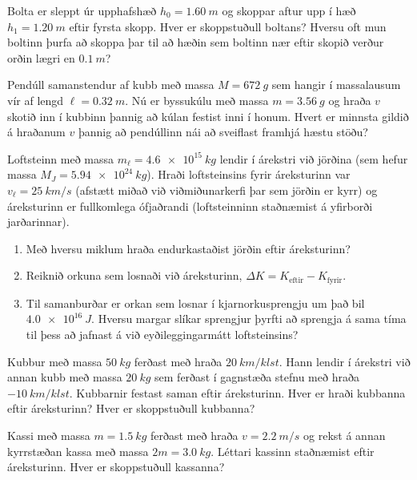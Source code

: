 \begin{enumerate}[label = \textbf{Dæmi \thechapter.\arabic*.}]
\begin{minipage}{\linewidth}
\item Bolta er sleppt úr upphafshæð $h_0 = \SI{1.60}{m}$ og skoppar aftur upp í hæð $h_1 = \SI{1.20}{m}$ eftir fyrsta skopp. Hver er skoppstuðull boltans? Hversu oft mun boltinn þurfa að skoppa þar til að hæðin sem boltinn nær eftir skopið verður orðin lægri en $\SI{0.1}{m}$?

\item Pendúll samanstendur af kubb með massa $M = \SI{672}{g}$ sem hangir í massalausum vír af lengd $\ell = \SI{0.32}{m}$. Nú er byssukúlu með massa $m = \SI{3.56}{g}$ og hraða $v$ skotið inn í kubbinn þannig að kúlan festist inni í honum. Hvert er minnsta gildið á hraðanum $v$ þannig að pendúllinn nái að sveiflast framhjá hæstu stöðu?


\item Loftsteinn með massa $m_\ell = \SI{4.6e15}{kg}$ lendir í árekstri við jörðina (sem hefur massa $M_J = \SI{5.94e24}{kg}$). Hraði loftsteinsins fyrir áreksturinn var $v_\ell = \SI{25}{km/s}$ (afstætt miðað við viðmiðunarkerfi þar sem jörðin er kyrr) og áreksturinn er fullkomlega ófjaðrandi (loftsteinninn staðnæmist á yfirborði jarðarinnar).

\end{minipage}

\begin{enumerate}[label = \textbf{(\alph*)}]
    \item Með hversu miklum hraða endurkastaðist jörðin eftir áreksturinn?
    
    \item Reiknið orkuna sem losnaði við áreksturinn, $\Delta K = K_{\text{eftir}} - K_{\text{fyrir}}$.
    
    \item Til samanburðar er orkan sem losnar í kjarnorkusprengju um það bil $\SI{4.0e16}{J}$. Hversu margar slíkar sprengjur þyrfti að sprengja á sama tíma til þess að jafnast á við eyðileggingarmátt loftsteinsins? 
\end{enumerate}

\item Kubbur með massa $\SI{50}{kg}$ ferðast með hraða $\SI{20}{km/klst}$. Hann lendir í árekstri við annan kubb með massa $\SI{20}{kg}$ sem ferðast í gagnstæða stefnu með hraða $-\SI{10}{km/klst}$. Kubbarnir festast saman eftir áreksturinn. Hver er hraði kubbanna eftir áreksturinn? Hver er skoppstuðull kubbanna?

\item Kassi með massa $m = \SI{1.5}{kg}$ ferðast með hraða $v = \SI{2.2}{m/s}$ og rekst á annan kyrrstæðan kassa með massa $2m = \SI{3.0}{kg}$. Léttari kassinn staðnæmist eftir áreksturinn. Hver er skoppstuðull kassanna?


\end{enumerate}

